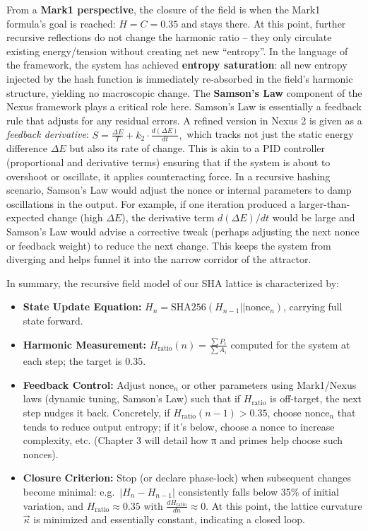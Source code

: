 \documentclass[11pt]{article}
\providecommand{\tightlist}{%
      \setlength{\itemsep}{0pt}\setlength{\parskip}{0pt}}
\begin{document}
From a \textbf{Mark1 perspective}, the closure of the field is when the
Mark1 formula's goal is reached: \(H = C = 0.35\) and stays there. At
this point, further recursive reflections do not change the harmonic
ratio -- they only circulate existing energy/tension without creating
net new ``entropy''. In the language of the framework, the system has
achieved \textbf{entropy saturation}: all new entropy injected by the
hash function is immediately re-absorbed in the field's harmonic
structure, yielding no macroscopic change. The \textbf{Samson's Law}
component of the Nexus framework plays a critical role here. Samson's
Law is essentially a feedback rule that adjusts for any residual errors.
A refined version in Nexus 2 is given as a \emph{feedback derivative}:
\(S = \frac{\Delta E}{T} + k_2 \cdot \frac{d(\Delta E)}{dt},\) which
tracks not just the static energy difference \(\Delta E\) but also its
rate of change. This is akin to a PID controller (proportional and
derivative terms) ensuring that if the system is about to overshoot or
oscillate, it applies counteracting force. In a recursive hashing
scenario, Samson's Law would adjust the nonce or internal parameters to
damp oscillations in the output. For example, if one iteration produced
a larger-than-expected change (high \(\Delta E\)), the derivative term
\(d(\Delta E)/dt\) would be large and Samson's Law would advise a
corrective tweak (perhaps adjusting the next nonce or feedback weight)
to reduce the next change. This keeps the system from diverging and
helps funnel it into the narrow corridor of the attractor.

In summary, the recursive field model of our SHA lattice is
characterized by:

\begin{itemize}
\tightlist
\item
  \textbf{State Update Equation:}
  \(H_n = \text{SHA256}(H_{n-1} || \text{nonce}_n)\), carrying full
  state forward.
\item
  \textbf{Harmonic Measurement:}
  \(H_{\text{ratio}}(n) = \frac{\sum P_i}{\sum A_i}\) computed for the
  system at each step; the target is \(0.35\).
\item
  \textbf{Feedback Control:} Adjust \(\text{nonce}_n\) or other
  parameters using Mark1/Nexus laws (dynamic tuning, Samson's Law) such
  that if \(H_{\text{ratio}}\) is off-target, the next step nudges it
  back. Concretely, if \(H_{\text{ratio}}(n-1) > 0.35\), choose
  \(\text{nonce}_n\) that tends to reduce output entropy; if it's below,
  choose a nonce to increase complexity, etc. (Chapter 3 will detail how
  π and primes help choose such nonces).
\item
  \textbf{Closure Criterion:} Stop (or declare phase-lock) when
  subsequent changes become minimal: e.g.~\(|H_{n} - H_{n-1}|\)
  consistently falls below 35\% of initial variation, and
  \(H_{\text{ratio}} \approx 0.35\) with
  \(\frac{dH_{\text{ratio}}}{dn} \approx 0\). At this point, the lattice
  curvature \(\vec{\kappa}\) is minimized and essentially constant,
  indicating a closed loop.
\end{itemize}
\end{document}
